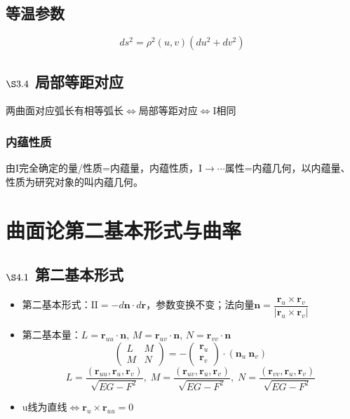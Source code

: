 \documentclass{article}
\begin{document}
	\subsection{等温参数}
	\[
	ds^2=\rho^2(u,v)(du^2+dv^2)
	\]
	
	\subsection{$\S3.4$ 局部等距对应}
	两曲面对应弧长有相等弧长$\iff$局部等距对应$\iff\mathrm{I}$相同
	\subsubsection{内蕴性质}
	由$\mathrm{I}$完全确定的量/性质=内蕴量，内蕴性质，$\mathrm{I}\to\cdots$属性=内蕴几何，以内蕴量、性质为研究对象的叫内蕴几何。
	
	
	
	\section{曲面论第二基本形式与曲率}
	\subsection{$\S4.1$ 第二基本形式}
	\begin{itemize}
		\item 第二基本形式：$\mathrm{II}=-d\boldsymbol{n}\cdot d\boldsymbol{r}$，参数变换不变；法向量$\boldsymbol{n}=\dfrac{\boldsymbol{r}_u\times\boldsymbol{r}_v}{|\boldsymbol{r}_u\times\boldsymbol{r}_v|}$
		\item 第二基本量：$L=\boldsymbol{r}_{uu}\cdot\boldsymbol{n},\,M=\boldsymbol{r}_{uv}\cdot\boldsymbol{n},\,N=\boldsymbol{r}_{vv}\cdot\boldsymbol{n}$
		\[
		\begin{pmatrix}L&M\\M&N\end{pmatrix}=-\begin{pmatrix}\boldsymbol{r}_u\\\boldsymbol{r}_v\end{pmatrix}\cdot(\boldsymbol{n}_u\ \boldsymbol{n}_v)
		\]
		\[
		L=\dfrac{(\boldsymbol{r}_{uu},\boldsymbol{r}_u,\boldsymbol{r}_v)}{\sqrt{EG-F^2}},\;
		M=\dfrac{(\boldsymbol{r}_{uv},\boldsymbol{r}_u,\boldsymbol{r}_v)}{\sqrt{EG-F^2}},\;
		N=\dfrac{(\boldsymbol{r}_{vv},\boldsymbol{r}_u,\boldsymbol{r}_v)}{\sqrt{EG-F^2}}
		\]
		\item u线为直线$\Leftrightarrow\boldsymbol{r}_u\times\boldsymbol{r}_{uu}=0$
	\end{itemize}
	
\end{document}
